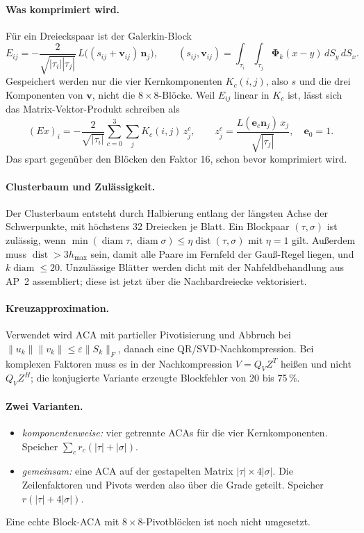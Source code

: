 \documentclass[11pt, a4paper]{article}
\newcommand{\mvec}[1]{\boldsymbol{#1}}
\newcommand{\n}{\mvec{n}}
\begin{document}
\paragraph{Was komprimiert wird.} Für ein Dreieckspaar ist der Galerkin-Block
\[
  E_{ij} = -\frac{2}{\sqrt{|\tau_i||\tau_j|}}\,L\big((s_{ij}+\mvec{v}_{ij})\,\n_j\big),\qquad
  (s_{ij},\mvec{v}_{ij}) = \int_{\tau_i}\!\int_{\tau_j}\mvec\Phi_k(x-y)\,dS_y\,dS_x .
\]
Gespeichert werden nur die vier Kernkomponenten $K_c(i,j)$, also $s$ und die drei Komponenten
von $\mvec v$, nicht die $8\times8$-Blöcke. Weil $E_{ij}$ linear in $K_c$ ist, lässt sich das
Matrix-Vektor-Produkt schreiben als
\[
  (Ex)_i = -\frac{2}{\sqrt{|\tau_i|}}\sum_{c=0}^{3}\sum_j K_c(i,j)\,z^c_j,\qquad
  z^c_j = \frac{L(\mvec{e}_c\n_j)\,x_j}{\sqrt{|\tau_j|}},\quad \mvec{e}_0=1 .
\]
Das spart gegenüber den Blöcken den Faktor 16, schon bevor komprimiert wird.

\paragraph{Clusterbaum und Zulässigkeit.} Der Clusterbaum entsteht durch Halbierung
entlang der längsten Achse der Schwerpunkte, mit höchstens 32 Dreiecken je Blatt. Ein
Blockpaar $(\tau,\sigma)$ ist zulässig, wenn
$\min(\operatorname{diam}\tau,\operatorname{diam}\sigma)\le\eta\operatorname{dist}(\tau,\sigma)$
mit $\eta=1$ gilt. Außerdem muss $\operatorname{dist}>3h_{\max}$ sein, damit alle Paare im
Fernfeld der Gauß-Regel liegen, und $k\operatorname{diam}\le20$. Unzulässige Blätter werden
dicht mit der Nahfeldbehandlung aus AP~2 assembliert; diese ist jetzt über die
Nachbardreiecke vektorisiert.

\paragraph{Kreuzapproximation.} Verwendet wird ACA mit partieller Pivotisierung und
Abbruch bei $\|u_k\|\|v_k\|\le\varepsilon\|S_k\|_F$, danach eine QR/SVD-Nachkompression.
Bei komplexen Faktoren muss es in der Nachkompression $V=Q_VZ^{T}$ heißen und nicht
$Q_VZ^{H}$; die konjugierte Variante erzeugte Blockfehler von 20 bis 75\,\%.

\paragraph{Zwei Varianten.}
\begin{itemize}[leftmargin=*]
  \item \emph{komponentenweise:} vier getrennte ACAs für die vier Kernkomponenten. Speicher
    $\sum_c r_c(|\tau|+|\sigma|)$.
  \item \emph{gemeinsam:} eine ACA auf der gestapelten Matrix $|\tau|\times4|\sigma|$. Die
    Zeilenfaktoren und Pivots werden also über die Grade geteilt. Speicher
    $r(|\tau|+4|\sigma|)$.
\end{itemize}
Eine echte Block-ACA mit $8\times8$-Pivotblöcken ist noch nicht umgesetzt.
\end{document}
